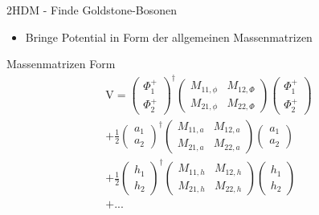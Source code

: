 \documentclass[xcolor=dvipsnames]{beamer}
\begin{document}
\begin{frame}{2HDM - Finde Goldstone-Bosonen}
\begin{itemize}
\item Bringe Potential in Form der allgemeinen Massenmatrizen
 \end{itemize}
 \begin{block}{Massenmatrizen Form}
 \begin{equation*}
 \begin{split}
\text{V}=\left( \begin{array}{c} \Phi^{+}_{1}\\ \Phi^{+}_{2} \end{array}\right)^{\dagger} \begin{pmatrix} M_{11,\phi} & M_{12,\Phi} \\  M_{21,\phi} & M_{22,\Phi}\end{pmatrix} \left( \begin{array}{c} \Phi^{+}_{1}\\ \Phi^{+}_{2} \end{array}\right)
\\
+\frac{1}{2}\left( \begin{array}{c} a_{1}\\ a_{2} \end{array}\right)^{\dagger} \begin{pmatrix} M_{11,a} & M_{12,a} \\  M_{21,a} & M_{22,a}\end{pmatrix} \left( \begin{array}{c}a_{1}\\ a_{2} \end{array}\right)
\\
+\frac{1}{2}\left( \begin{array}{c} h_{1}\\ h_{2} \end{array}\right)^{\dagger} \begin{pmatrix} M_{11,h} & M_{12,h} \\  M_{21,h} & M_{22,h}\end{pmatrix} \left( \begin{array}{c}h_{1}\\ h_{2} \end{array}\right) 
\\
+ ...
\end{split}
\end{equation*} 

\end{block}

\end{frame}
\end{document}
